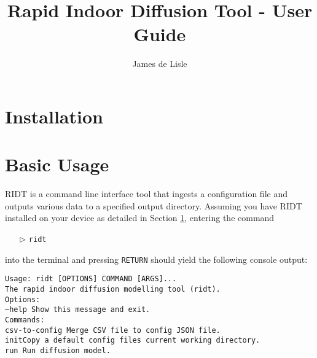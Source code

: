 \documentclass[]{article}
\title{Rapid Indoor Diffusion Tool - User Guide}
\author{James de Lisle}
\def\code#1{\texttt{#1}}
\def\HS{\hspace{\fontdimen2\font}}
\begin{document}
\maketitle

\tableofcontents

\section{Installation}\label{sec:installation}

\section{Basic Usage}

RIDT is a command line interface tool that ingests a configuration file and
outputs various data to a specified output directory. Assuming you have RIDT
installed on your device as detailed in Section \ref{sec:installation}, entering
the command 
\begin{itemize}
    \item[$\triangleright$] \code{ridt}
\end{itemize}
into the terminal and pressing \code{RETURN} should yield the following console
output:\\

\begin{addmargin}[1.5em]{1em}
\begin{tcolorbox}[enhanced,width=6in,fontupper=\bfseries,drop shadow
southwest,sharp corners, before upper={\parindent15pt}]
\noindent\code{Usage: ridt [OPTIONS] COMMAND [ARGS]...}\\

\indent\code{The rapid indoor diffusion modelling tool (ridt).}\\

\noindent\code{Options:}\\
\indent\code{--help  Show this message and exit.}\\

\noindent\code{Commands:}\\
\indent\code{csv-to-config \HS\HS\HS\HS Merge CSV file to config JSON file.}\\
\indent\code{init\HS\HS\HS\HS\HS\HS\HS\HS\HS\HS\HS\HS\HS\HS Copy a default 
config files current working directory.}\\
\indent\code{run \HS\HS\HS\HS\HS\HS\HS\HS\HS\HS\HS\HS\HS\HS Run diffusion model.}
\end{tcolorbox}
\end{addmargin}
\medskip
\end{document}
